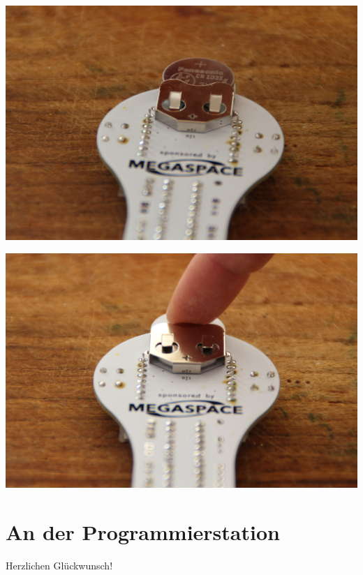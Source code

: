 \documentclass{article}
\begin{document}
\begin{minipage}[b]{0.5\textwidth}
	\includegraphics[width=\textwidth]{Bilder2023/IMG_8388.JPG}
\end{minipage}
\begin{minipage}[b]{0.5\textwidth}
	\includegraphics[width=\textwidth]{Bilder2023/IMG_8390.JPG}
\end{minipage}

\vspace{0.5cm}

\section{An der Programmierstation}

Herzlichen Glückwunsch! \\
\end{document}
